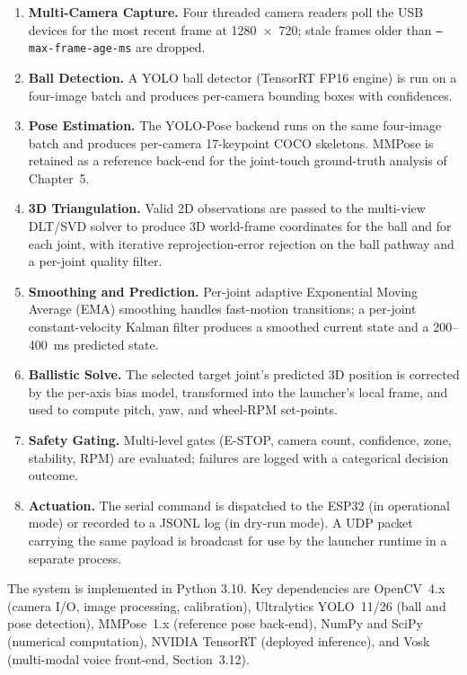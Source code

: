 \begin{enumerate}
    \item \textbf{Multi-Camera Capture.} Four threaded camera readers poll the USB devices for the most recent frame at 1280~$\times$~720; stale frames older than \texttt{--max-frame-age-ms} are dropped.
    \item \textbf{Ball Detection.} A YOLO ball detector (TensorRT FP16 engine) is run on a four-image batch and produces per-camera bounding boxes with confidences.
    \item \textbf{Pose Estimation.} The YOLO-Pose backend runs on the same four-image batch and produces per-camera 17-keypoint COCO skeletons. MMPose is retained as a reference back-end for the joint-touch ground-truth analysis of Chapter~5.
    \item \textbf{3D Triangulation.} Valid 2D observations are passed to the multi-view DLT/SVD solver to produce 3D world-frame coordinates for the ball and for each joint, with iterative reprojection-error rejection on the ball pathway and a per-joint quality filter.
    \item \textbf{Smoothing and Prediction.} Per-joint adaptive Exponential Moving Average (EMA) smoothing handles fast-motion transitions; a per-joint constant-velocity Kalman filter produces a smoothed current state and a 200--400~ms predicted state.
    \item \textbf{Ballistic Solve.} The selected target joint's predicted 3D position is corrected by the per-axis bias model, transformed into the launcher's local frame, and used to compute pitch, yaw, and wheel-RPM set-points.
    \item \textbf{Safety Gating.} Multi-level gates (E-STOP, camera count, confidence, zone, stability, RPM) are evaluated; failures are logged with a categorical decision outcome.
    \item \textbf{Actuation.} The serial command is dispatched to the ESP32 (in operational mode) or recorded to a JSONL log (in dry-run mode). A UDP packet carrying the same payload is broadcast for use by the launcher runtime in a separate process.
\end{enumerate}

The system is implemented in Python 3.10. Key dependencies are OpenCV~4.x \cite{ref27} (camera I/O, image processing, calibration), Ultralytics YOLO~11/26 \cite{ref14} (ball and pose detection), MMPose~1.x \cite{ref17} (reference pose back-end), NumPy \cite{ref28} and SciPy \cite{ref29} (numerical computation), NVIDIA TensorRT \cite{ref38_tensorrt} (deployed inference), and Vosk \cite{ref41_vosk} (multi-modal voice front-end, Section~3.12).

